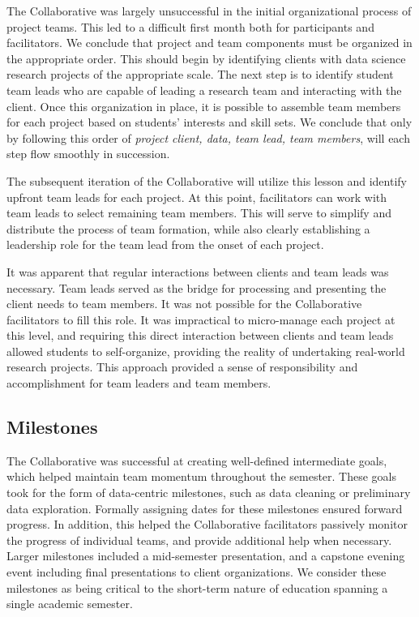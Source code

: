 \documentclass[12pt]{article}
\begin{document}
The Collaborative was largely unsuccessful in the initial organizational process of project teams.  This led to a difficult first month both for participants and facilitators.  We conclude that project and team components must be organized in the appropriate order.  This should begin by identifying clients with data science research projects of the appropriate scale.  The next step is to identify student team leads who are capable of leading a research team and interacting with the client.  Once this organization in place, it is possible to assemble team members for each project based on students' interests and skill sets.  We conclude that only by following this order of \emph{project client, data, team lead, team members}, will each step flow smoothly in succession.

The subsequent iteration of the Collaborative will utilize this lesson and identify upfront team leads for each project.  At this point, facilitators can work with team leads to select remaining team members. This will serve to simplify and distribute the process of team formation, while also clearly establishing a leadership role for the team lead from the onset of each project.

It was apparent that regular interactions between clients and team leads was necessary. Team leads served as the bridge for processing and presenting the client needs to team members.  It was not possible for the Collaborative facilitators to fill this role.  It was impractical to micro-manage each project at this level, and requiring this direct interaction between clients and team leads allowed students to self-organize, providing the reality of undertaking real-world research projects.  This approach provided a sense of responsibility and accomplishment for team leaders and team members.

\subsection{Milestones}

The Collaborative was successful at creating well-defined intermediate goals, which helped maintain team momentum throughout the semester.  These goals took for the form of data-centric milestones, such as data cleaning or preliminary data exploration.  Formally assigning dates for these milestones ensured forward progress.  In addition, this helped the Collaborative facilitators passively monitor the progress of individual teams, and provide additional help when necessary.  Larger milestones included a mid-semester presentation, and a capstone evening event including final presentations to client organizations.  We consider these milestones as being critical to the short-term nature of education spanning a single academic semester.
\end{document}

